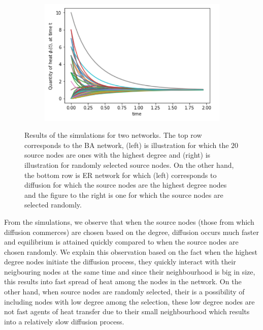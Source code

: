 \documentclass[10pt,a4paper]{article}
\theoremstyle{plain}
\theoremstyle{definition}
\begin{document}
\begin{figure}[H]
\begin{subfigure}[b]{0.45\textwidth}
     		\caption{}
     		\label{}
     	\end{subfigure}~
     	\begin{subfigure}[b]{0.45\textwidth}
     		\includegraphics[width= \textwidth]{images/ER-randomsource.png}
     		\caption{}
     		\label{}
     	\end{subfigure}
     	\caption{ Results of the simulations for two networks. The top row corresponds to the BA network, (left) is illustration for which the $20$ source nodes are ones with the highest degree and (right) is illustration for randomly selected source nodes. On the other hand, the bottom row is ER network for which (left) corresponds to diffusion for which the source nodes are the highest degree nodes and the figure to the right is one for which the source nodes are selected randomly.}
     	\label{sourceimpact}
     \end{figure}
     
     From the simulations, we observe that when the source nodes (those  from which diffusion commerces) are chosen based on the degree, diffusion occurs much faster and equilibrium is attained quickly compared to when the source nodes are chosen randomly. We explain this observation based on the fact when the highest degree nodes initiate the diffusion process, they quickly interact with their neigbouring nodes at the same time and since their neighbourhood is big in size, this results into fast spread of heat among the nodes in the network. On the other hand, when source nodes are randomly selected, their is a possibility of including nodes with low degree among the selection, these low degree nodes are not fast agents of heat transfer due to their small neighbourhood which results into a relatively slow diffusion process.
     
\end{document}

